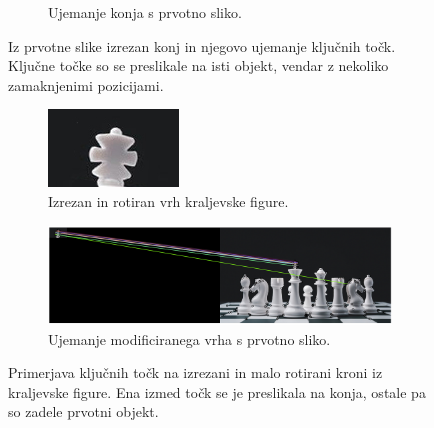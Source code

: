 \documentclass[a4paper,11pt]{article}
\begin{document}
\begin{figure}[hb]
\begin{subfigure}[t]{1\textwidth}
		\caption{Ujemanje konja s prvotno sliko.}
		\label{img:chess_knight_match}
	\end{subfigure}
	\caption{Iz prvotne slike izrezan konj in njegovo ujemanje ključnih točk. Ključne točke so se preslikale na isti objekt, vendar z nekoliko zamaknjenimi pozicijami. }
	\label{img:match_object}
\end{figure}


\begin{figure}[hb]
\centering
	\begin{subfigure}[t]{0.48\textwidth}
		\centering
		\includegraphics[width=\textwidth]{images/chess_crown.jpg}
		\caption{Izrezan in rotiran vrh kraljevske figure.}
		\label{img:chess_crown}
	\end{subfigure}
	\begin{subfigure}[t]{1\textwidth}
		\centering
			\includegraphics[width=1\textwidth]{images/match_rotate_small.png}
		\caption{Ujemanje modificiranega vrha s prvotno sliko.}
		\label{img:chess_crown_match}
	\end{subfigure}

	\caption{Primerjava ključnih točk na izrezani in malo rotirani kroni iz kraljevske figure. Ena izmed točk se je preslikala na konja, ostale pa so zadele prvotni objekt.}
	\label{img:match_rotate_small}
\end{figure}
\end{document}
